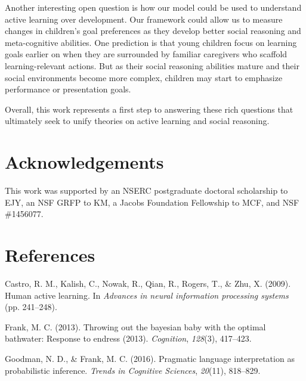 \documentclass[10pt, letterpaper]{article}
\begin{document}
Another interesting open question is how our model could be used to
understand active learning over development. Our framework could allow
us to measure changes in children's goal preferences as they develop
better social reasoning and meta-cognitive abilities. One prediction is
that young children focus on learning goals earlier on when they are
surrounded by familiar caregivers who scaffold learning-relevant
actions. But as their social reasoning abilities mature and their social
environments become more complex, children may start to emphasize
performance or presentation goals.

Overall, this work represents a first step to answering these rich
questions that ultimately seek to unify theories on active learning and
social reasoning.

\vspace{1em}
\vspace{1em} \noindent

\section{Acknowledgements}\label{acknowledgements}

This work was supported by an NSERC postgraduate doctoral scholarship to
EJY, an NSF GRFP to KM, a Jacobs Foundation Fellowship to MCF, and NSF
\#1456077.

\section{References}\label{references}

\setlength{\parindent}{-0.1in} \setlength{\leftskip}{0.125in}

\noindent

\hypertarget{refs}{}
\hypertarget{ref-castro2009human}{}
Castro, R. M., Kalish, C., Nowak, R., Qian, R., Rogers, T., \& Zhu, X.
(2009). Human active learning. In \emph{Advances in neural information
processing systems} (pp. 241--248).

\hypertarget{ref-frank2013throwing}{}
Frank, M. C. (2013). Throwing out the bayesian baby with the optimal
bathwater: Response to endress (2013). \emph{Cognition}, \emph{128}(3),
417--423.

\hypertarget{ref-goodman2016}{}
Goodman, N. D., \& Frank, M. C. (2016). Pragmatic language
interpretation as probabilistic inference. \emph{Trends in Cognitive
Sciences}, \emph{20}(11), 818--829.
\end{document}
